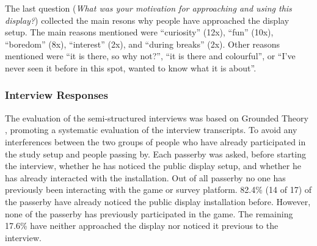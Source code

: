	The last question (\textit{What was your motivation for approaching and using this display?}) collected the main resons why people have approached the display setup. The main reasons mentioned were ``curiosity'' (12x), ``fun'' (10x), ``boredom'' (8x), ``interest'' (2x), and ``during breaks'' (2x). Other reasons mentioned were ``it is there, so why not?'', ``it is there and colourful'', or ``I've never seen it before in this spot, wanted to know what it is about''.




	\subsubsection{Interview Responses}

	The evaluation of the semi-structured interviews was based on Grounded Theory \cite{strauss1990basics}, promoting a systematic evaluation of the interview transcripts.
	To avoid any interferences between the two groups of people who have already participated in the study setup and people passing by. Each passerby was asked, before starting the interview, whether he has noticed the public display setup, and whether he has already interacted with the installation. Out of all passerby no one has previously been interacting with the game or survey platform. 82.4\% (14 of 17) of the passerby have already noticed the public display installation before. However, none of the passerby has previously participated in the game. The remaining 17.6\% have neither approached the display nor noticed it previous to the interview. 


